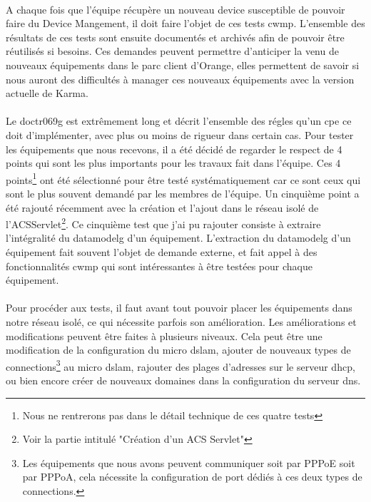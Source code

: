 \documentclass[12pt,a4paper]{report}
\begin{document}
\paragraph*{}A chaque fois que l’équipe récupère un nouveau device susceptible de pouvoir faire du Device Mangement, il doit faire l’objet de ces tests \gls{cwmp}. L’ensemble des résultats de ces tests sont ensuite documentés et archivés afin de pouvoir être réutilisés si besoins. Ces demandes peuvent permettre d'anticiper la venu de nouveaux équipements dans le parc client d'Orange, elles permettent de savoir si nous auront des difficultés à manager ces nouveaux équipements avec la version actuelle de Karma. 
\paragraph*{}Le \gls{doctr069g} est extrêmement long et décrit l'ensemble des régles qu’un \gls{cpe} ce doit d'implémenter, avec plus ou moins de rigueur dans certain cas. Pour tester les équipements que nous recevons, il a été décidé de regarder le respect de 4 points qui sont les plus importants pour les travaux fait dans l’équipe. Ces 4 points\footnote{Nous ne rentrerons pas dans le détail technique de ces quatre tests} ont été sélectionné pour être testé systématiquement car ce sont ceux qui sont le plus souvent demandé par les membres de l’équipe. Un cinquième point a été rajouté récemment avec la création et l’ajout dans le réseau isolé de l’ACSServlet\footnote{Voir la partie intitulé "Création d'un ACS Servlet"}. Ce cinquième test que j’ai pu rajouter consiste à extraire l’intégralité du {datamodelg} d’un équipement. L’extraction du {datamodelg} d’un équipement fait souvent l’objet de demande externe, et fait appel à des fonctionnalités \gls{cwmp} qui sont intéressantes à être testées pour chaque équipement.
\paragraph*{}Pour procéder aux tests, il faut avant tout pouvoir placer les équipements dans notre réseau isolé, ce qui nécessite parfois son amélioration. Les améliorations et modifications peuvent être faites à plusieurs niveaux. Cela peut être une modification de la configuration du micro \gls{dslam}, ajouter de nouveaux types de connections\footnote{Les équipements que nous avons peuvent communiquer soit par PPPoE soit par PPPoA, cela nécessite la configuration de port dédiés à ces deux types de connections.} au micro \gls{dslam}, rajouter des plages d’adresses sur le serveur \gls{dhcp}, ou bien encore créer de nouveaux domaines dans la configuration du serveur \gls{dns}.
\end{document}
